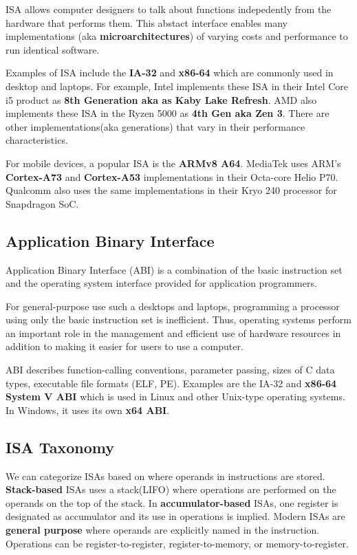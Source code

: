 \documentclass[a4paper, 11pt,oneside]{article}
\begin{document}
ISA allows computer designers to talk about functions indepedently from the 
hardware that performs them. This abstact interface enables many 
implementations (aka \textbf{microarchitectures}) of varying costs and 
performance to run identical software.

Examples of ISA include the \textbf{IA-32} and \textbf{x86-64} which are 
commonly used in desktop and laptops. For example, Intel implements these ISA 
in their Intel Core i5 product as \textbf{8th Generation aka as Kaby Lake 
Refresh}. AMD also implements these ISA in the Ryzen 5000 as \textbf{4th Gen 
aka Zen 3}. There are other implementations(aka generations) that vary in their 
performance characteristics.

For mobile devices, a popular ISA is the \textbf{ARMv8 A64}. MediaTek uses 
ARM's \textbf{Cortex-A73} and \textbf{Cortex-A53} implementations in their 
Octa-core Helio P70. Qualcomm also uses the same implementations in their Kryo 
240 processor for Snapdragon SoC.

\subsection{Application Binary Interface}
Application Binary Interface (ABI) is a combination of the basic instruction 
set and the operating system interface provided for application programmers. 

For general-purpose use such a desktops and laptops, programming a processor 
using only the basic instruction set is inefficient. Thus, operating systems 
perform an important role in the management and efficient use of hardware 
resources in addition to making it easier for users to use a computer. 

ABI describes function-calling conventions, parameter passing, sizes of 
C data types, executable file formats (ELF, PE). Examples are the IA-32 and 
\textbf{x86-64 System V ABI} which is used in Linux and other Unix-type 
operating systems. In Windows, it uses its own \textbf{x64 ABI}.

\subsection{ISA Taxonomy}
We can categorize ISAs based on where operands in instructions are stored.
\textbf{Stack-based} ISAs uses a stack(LIFO) where operations are performed on 
the operands on the top of the stack. In \textbf{accumulator-based} ISAs, one 
register is designated as accumulator and its use in operations is implied. 
Modern ISAs are \textbf{general purpose} where operands are explicitly named in 
the instruction. Operations can be register-to-register, register-to-memory, 
or memory-to-register.
\end{document}
